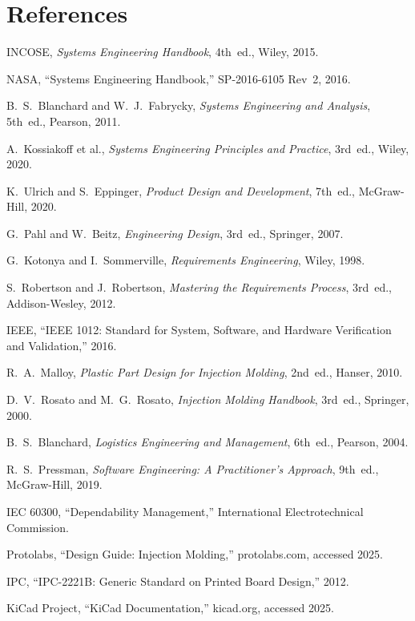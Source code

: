 \chapter*{References}

\begin{enumerate}[label={[\arabic*]},leftmargin=2em]
\item INCOSE, \emph{Systems Engineering Handbook}, 4th~ed., Wiley, 2015.
\item NASA, ``Systems Engineering Handbook,'' SP-2016-6105 Rev~2, 2016.
\item B.~S.~Blanchard and W.~J.~Fabrycky, \emph{Systems Engineering and Analysis}, 5th~ed., Pearson, 2011.
\item A.~Kossiakoff et al., \emph{Systems Engineering Principles and Practice}, 3rd~ed., Wiley, 2020.
\item K.~Ulrich and S.~Eppinger, \emph{Product Design and Development}, 7th~ed., McGraw-Hill, 2020.
\item G.~Pahl and W.~Beitz, \emph{Engineering Design}, 3rd~ed., Springer, 2007.
\item G.~Kotonya and I.~Sommerville, \emph{Requirements Engineering}, Wiley, 1998.
\item S.~Robertson and J.~Robertson, \emph{Mastering the Requirements Process}, 3rd~ed., Addison-Wesley, 2012.
\item IEEE, ``IEEE 1012: Standard for System, Software, and Hardware Verification and Validation,'' 2016.
\item R.~A.~Malloy, \emph{Plastic Part Design for Injection Molding}, 2nd~ed., Hanser, 2010.
\item D.~V.~Rosato and M.~G.~Rosato, \emph{Injection Molding Handbook}, 3rd~ed., Springer, 2000.
\item B.~S.~Blanchard, \emph{Logistics Engineering and Management}, 6th~ed., Pearson, 2004.
\item R.~S.~Pressman, \emph{Software Engineering: A Practitioner's Approach}, 9th~ed., McGraw-Hill, 2019.
\item IEC 60300, ``Dependability Management,'' International Electrotechnical Commission.
\item Protolabs, ``Design Guide: Injection Molding,'' protolabs.com, accessed 2025.
\item IPC, ``IPC-2221B: Generic Standard on Printed Board Design,'' 2012.
\item KiCad Project, ``KiCad Documentation,'' kicad.org, accessed 2025.

\end{enumerate}
